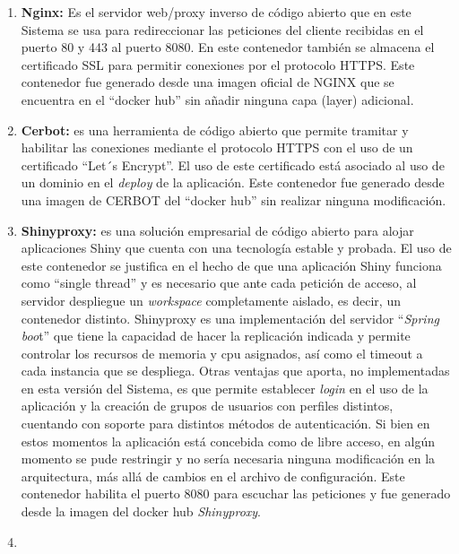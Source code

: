 \documentclass[
  12pt,
  openany]{book}
\begin{document}
\begin{enumerate}
\def\labelenumi{\arabic{enumi}.}
\item
  \textbf{Nginx:} Es el servidor web/proxy inverso de código abierto que en este Sistema se usa para redireccionar las peticiones del cliente recibidas en el puerto 80 y 443 al puerto 8080. En este contenedor también se almacena el certificado SSL para permitir conexiones por el protocolo HTTPS. Este contenedor fue generado desde una imagen oficial de NGINX que se encuentra en el ``docker hub'' sin añadir ninguna capa (layer) adicional.
\item
  \textbf{Cerbot:} es una herramienta de código abierto que permite tramitar y habilitar las conexiones mediante el protocolo HTTPS con el uso de un certificado ``Let´s Encrypt''. El uso de este certificado está asociado al uso de un dominio en el \emph{deploy} de la aplicación. Este contenedor fue generado desde una imagen de CERBOT del ``docker hub'' sin realizar ninguna modificación.
\item
  \textbf{Shinyproxy:} es una solución empresarial de código abierto para alojar aplicaciones Shiny \citep{shinyproxy2023} que cuenta con una tecnología estable y probada. El uso de este contenedor se justifica en el hecho de que una aplicación Shiny funciona como ``single thread'' y es necesario que ante cada petición de acceso, al servidor despliegue un \emph{workspace} completamente aislado, es decir, un contenedor distinto. Shinyproxy es una implementación del servidor ``\emph{Spring boo}t'' que tiene la capacidad de hacer la replicación indicada y permite controlar los recursos de memoria y cpu asignados, así como el timeout a cada instancia que se despliega. Otras ventajas que aporta, no implementadas en esta versión del Sistema, es que permite establecer \emph{login} en el uso de la aplicación y la creación de grupos de usuarios con perfiles distintos, cuentando con soporte para distintos métodos de autenticación. Si bien en estos momentos la aplicación está concebida como de libre acceso, en algún momento se pude restringir y no sería necesaria ninguna modificación en la arquitectura, más allá de cambios en el archivo de configuración. Este contenedor habilita el puerto 8080 para escuchar las peticiones y fue generado desde la imagen del docker hub \emph{Shinyproxy}.
\item

\end{enumerate}
\end{document}
